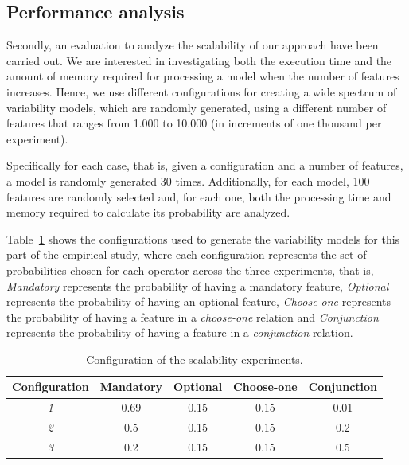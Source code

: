 \subsection{Performance analysis}
\label{sec:stat:impl:performance:analysis}

Secondly, an evaluation to analyze the scalability of our approach
have been carried out. We are interested in investigating both the
execution time and the amount of memory required for processing a model
when the number of features increases.
Hence, we use different configurations for creating a wide
spectrum of variability models, which are randomly generated,
using a different number of features that ranges from 1.000 to 10.000 (in increments of one thousand per experiment).

Specifically for each case, that is, given a configuration and a number of features,
a model is randomly generated 30 times.
Additionally, for each model, 100 features are
randomly selected and, for each one, both the processing time and memory
required to calculate its probability are analyzed.



Table~\ref{scalaExperiment} shows the configurations used to generate the
variability models for this part of the empirical study,
where each configuration represents the set of probabilities chosen for each operator across the three experiments,
that is, \textit{Mandatory} represents the probability of having a mandatory feature,
 \textit{Optional} represents the probability of having an optional feature,
 \textit{Choose-one} represents the probability of having a feature in a \textit{choose-one} relation and
 \textit{Conjunction} represents the probability of having a feature in a \textit{conjunction} relation.

\begin{table}[h]
\centering
\begin{tabular}{|c|c|c|c|c|}
\hline
\textbf{Configuration} & \textbf{Mandatory} &  \textbf{Optional} &  \textbf{Choose-one} &  \textbf{Conjunction} \\ \hline
        \textit{1}              & 0.69  & 0.15  & 0.15  & 0.01  \\ \hline
        \textit{2}              & 0.5           & 0.15  & 0.15  & 0.2           \\ \hline
        \textit{3}              & 0.2           & 0.15  & 0.15  & 0.5   \\ \hline
\end{tabular}
\caption{Configuration of the scalability experiments.}
\label{scalaExperiment}
\end{table}

